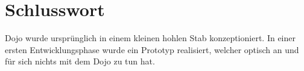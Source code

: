 \section{Schlusswort} \label{sec:schlusswort}

Dojo wurde ursprünglich in einem kleinen hohlen Stab konzeptioniert. In einer ersten Entwicklungsphase wurde ein Prototyp realisiert, welcher optisch an und für sich nichts mit dem Dojo zu tun hat. 
